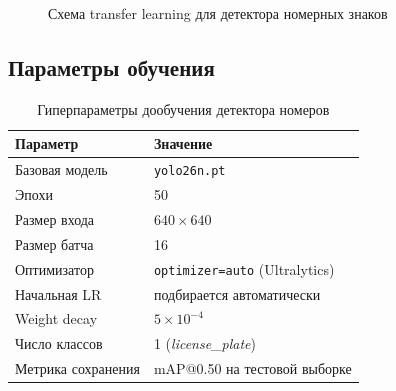 \documentclass[10pt,a4paper]{report}
\numberwithin{equation}{chapter}
\numberwithin{figure}{chapter}
\numberwithin{table}{chapter}
\begin{document}
\begin{figure}[H]
\centering
{}
\caption{Схема transfer learning для детектора номерных знаков}
\label{fig:transfer}
\end{figure}

\subsection{Параметры обучения}

\begin{table}[H]
\centering
\caption{Гиперпараметры дообучения детектора номеров}
\label{tab:plate_hp}
\begin{tabularx}{\textwidth}{lX}
\toprule
\textbf{Параметр} & \textbf{Значение} \\
\midrule
Базовая модель       & \texttt{yolo26n.pt} \\
Эпохи                & 50 \\
Размер входа         & $640 \times 640$ \\
Размер батча         & 16 \\
Оптимизатор          & \texttt{optimizer=auto} (Ultralytics) \\
Начальная LR         & подбирается автоматически \\
Weight decay         & $5 \times 10^{-4}$ \\
Число классов        & 1 (\textit{license\_plate}) \\
Метрика сохранения   & mAP@0.50 на тестовой выборке \\
\bottomrule
\end{tabularx}
\end{table}
\end{document}
